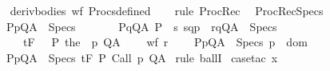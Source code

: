 \begin{isabellebody}
%
\isadelimproof
\ \ %
\endisadelimproof
%
\isatagproof
{}\isamarkupfalse%
\ deriv{\isacharunderscore}bodies\ wf\ Procs{\isacharunderscore}defined\isanewline
\ \ \isamarkupfalse%
\ {\isacharparenleft}rule\ ProcRec{\isacharparenright}%
\endisatagproof
{\isafoldproof}%
%
\isadelimproof
\isanewline
%
\endisadelimproof
\isanewline
{}\isamarkupfalse%
\ \ ProcRecSpecs{\isacharcolon}\isanewline
\ \ {\isachardoublequoteopen}{\isasymlbrakk}{\isasymforall}{\isasymsigma}{\isachardot}\ {\isasymforall}{\isacharparenleft}P{\isacharcomma}p{\isacharcomma}Q{\isacharcomma}A{\isacharparenright}\ {\isasymin}\ Specs{\isachardot}\ \isanewline
\ \ \ \ \ {\isasymGamma}{\isacharcomma}{\isasymTheta}{\isasymunion}\ {\isacharparenleft}{\isacharparenleft}{\isasymlambda}{\isacharparenleft}P{\isacharcomma}q{\isacharcomma}Q{\isacharcomma}A{\isacharparenright}{\isachardot}\ {\isacharparenleft}P\ {\isasyminter}\ {\isacharbraceleft}s{\isachardot}\ {\isacharparenleft}{\isacharparenleft}s{\isacharcomma}q{\isacharparenright}{\isacharcomma}{\isacharparenleft}{\isasymsigma}{\isacharcomma}p{\isacharparenright}{\isacharparenright}\ {\isasymin}\ r{\isacharbraceright}{\isacharcomma}q{\isacharcomma}Q{\isacharcomma}A{\isacharparenright}{\isacharparenright}\ {\isacharbackquote}\ Specs{\isacharparenright}\isanewline
\ \ \ \ \ \ {\isasymturnstile}\isactrlsub t\isactrlbsub {\isacharslash}F\isactrlesub \ {\isacharparenleft}{\isacharbraceleft}{\isasymsigma}{\isacharbraceright}\ {\isasyminter}\ P{\isacharparenright}\ {\isacharparenleft}the\ {\isacharparenleft}{\isasymGamma}\ p{\isacharparenright}{\isacharparenright}\ Q{\isacharcomma}A{\isacharsemicolon}\isanewline
\ \ \ \ wf\ r{\isacharsemicolon}\isanewline
\ \ \ \ {\isasymforall}{\isacharparenleft}P{\isacharcomma}p{\isacharcomma}Q{\isacharcomma}A{\isacharparenright}\ {\isasymin}\ Specs{\isachardot}\ p\ {\isasymin}\ dom\ {\isasymGamma}{\isasymrbrakk}\isanewline
\ \ {\isasymLongrightarrow}\ {\isasymforall}{\isacharparenleft}P{\isacharcomma}p{\isacharcomma}Q{\isacharcomma}A{\isacharparenright}\ {\isasymin}\ Specs{\isachardot}\ {\isasymGamma}{\isacharcomma}{\isasymTheta}{\isasymturnstile}\isactrlsub t\isactrlbsub {\isacharslash}F\isactrlesub \ P\ {\isacharparenleft}Call\ p{\isacharparenright}\ Q{\isacharcomma}A{\isachardoublequoteclose}\isanewline
%
\isadelimproof
%
\endisadelimproof
%
\isatagproof
{}\isamarkupfalse%
\ {\isacharparenleft}rule\ ballI{\isacharparenright}\isanewline
{}\isamarkupfalse%
\ {\isacharparenleft}case{\isacharunderscore}tac\ x{\isacharparenright}\isanewline
{}\isamarkupfalse%

\end{isabellebody}
